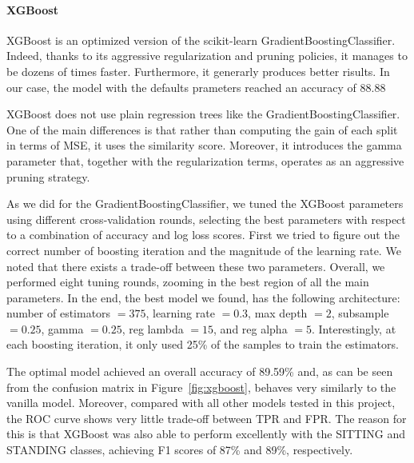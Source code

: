 \documentclass[10pt, a4paper, twocolumn]{article}
\begin{document}
\paragraph{XGBoost} XGBoost is an optimized version of the scikit-learn GradientBoostingClassifier. Indeed, thanks to its aggressive regularization and pruning policies, it manages to be dozens of times faster. Furthermore, it generarly produces better risults. In our case, the model with the defaults prameters reached an accuracy of 88.88%

XGBoost does not use plain regression trees like the GradientBoostingClassifier. One of the main differences is that rather than computing the gain of each split in terms of MSE, it uses the similarity score. Moreover, it introduces the gamma parameter that, together with the regularization terms, operates as an aggressive pruning strategy. 

As we did for the GradientBoostingClassifier, we tuned the XGBoost parameters using different cross-validation rounds, selecting the best parameters with respect to a combination of accuracy and log loss scores. First we tried to figure out the correct number of boosting iteration and the magnitude of the learning rate. We noted that there exists a trade-off between these two parameters. Overall, we performed eight tuning rounds, zooming in the best region of all the main parameters. In the end, the best model we found, has the following architecture: number of estimators $=375$, learning rate $=0.3$, max depth $=2$, subsample $=0.25$, gamma $=0.25$, reg lambda $=15$, and reg alpha $=5$. Interestingly, at each boosting iteration, it only used 25\% of the samples to train the estimators. 

The optimal model achieved an overall accuracy of 89.59\% and, as can be seen from the confusion matrix in Figure~\ref{fig:xgboost}, behaves very similarly to the vanilla model. Moreover, compared with all other models tested in this project, the ROC curve shows very little trade-off between TPR and FPR. The reason for this is that XGBoost was also able to perform excellently with the SITTING and STANDING classes, achieving F1 scores of 87\% and 89\%, respectively.
\end{document}
